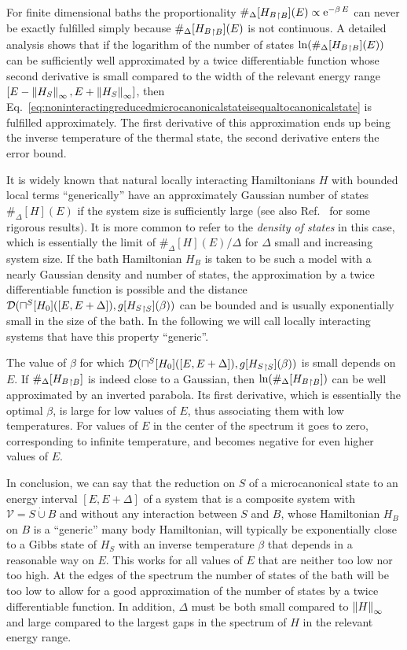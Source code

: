 \documentclass[a4paper,12pt,listof=totoc,index=totoc,bibliography=totoc,headsepline=false,headings=normal,BCOR16.153846mm,DIV12,headinclude,twoside,cleardoublepage=empty,numbers=noenddot,final]{scrreprt}
\theoremstyle{mystyle}
\numberwithin{equation}{section}
\numberwithin{figure}{section}
\numberwithin{lemma}{section}
\numberwithin{theorem}{section}
\numberwithin{corollary}{section}
\numberwithin{definition}{section}
\numberwithin{conjecture}{section}
\numberwithin{observation}{section}
\newcommand{\+}{\mkern2mu}
\newcommand{\dunion}{\mathbin{\dot{\cup}}}
\newcommand{\texteqref}[1]{Eq.~\eqref{#1}}
\renewcommand{\H}{H}
\newcommand{\rhog}{g}
\newcommand{\rhomc}{{\sqcap}}
\newcommand{\Vset}{\mathcal{V}}
\newcommand{\norm}[2][]{
  \ifthenelse{\equal{#1}{}}
    {\left\| {#2} \right\|}
    {\ifthenelse{\equal{#1}{uinv}}
      {\left\vert\kern-0.25ex\left\vert\kern-0.25ex\left\vert {#2} \right\vert\kern-0.25ex\right\vert\kern-0.25ex\right\vert}
      {\left\| {#2} \right\|_{#1}}
    }
}
\newcommand{\tracedistance}[3][]{
  \ifthenelse{\equal{#2}{}}
  {\ifthenelse{\equal{#3}{}}
    {\mathcal{D}_{#1}}{}
  }{
    \ifthenelse{\equal{#1}{}}
    {\operatorname{\mathcal{D}}(#2,#3)}
    {\operatorname{\mathcal{D}}_{#1}(#2,#3)}
  }
}
\newcommand{\trunc}[2]{{#1}_{\upharpoonright \mathnormal{#2}}}
\newcommand{\e}{\mathrm{e}}
\DeclareMathOperator{\1}{\mathds{1}}
\begin{document}
For finite dimensional baths the proportionality $\#_\Delta[\trunc{\H_B}B](E) \propto \e^{-\beta\,E}$ can never be exactly fulfilled simply because $\#_\Delta[\trunc{\H_B}B](E)$ is not continuous.
A detailed analysis \cite[Appendix A]{Riera2012} shows that if the logarithm of the number of states $\ln(\#_\Delta[\trunc{\H_B}B](E))$ can be sufficiently well approximated by a twice differentiable function whose second derivative is small compared to the width of the relevant energy range $[E-\norm[\infty]{\H_S},E+\norm[\infty]{\H_S}]$, then \texteqref{eq:noninteractingreducedmicrocanonicalstateisequaltocanonicalstate} is fulfilled approximately.
The first derivative of this approximation ends up being the inverse temperature of the thermal state, the second derivative enters the error bound.

It is widely known that natural locally interacting Hamiltonians $\H$ with bounded local terms ``generically'' have an approximately Gaussian number of states $\#_\Delta[\H](E)$ if the system size is sufficiently large \cite[Section 12.2]{Gemmer09} (see also Ref.~\cite{Hartmann2005} for some rigorous results).
It is more common to refer to the \emph{density of states} in this case, which is essentially the limit of $\#_\Delta[\H](E)/\Delta$ for $\Delta$ small and increasing system size.
If the bath Hamiltonian $\H_B$ is taken to be such a model with a nearly Gaussian density and number of states, the approximation by a twice differentiable function is possible and the distance $\tracedistance{\rhomc^S[\H_0]([E,E+\Delta])}{\rhog[\trunc{\H_S}S](\beta)}$ can be bounded \cite[Appendix B]{Riera2012} and is usually exponentially small in the size of the bath.
In the following we will call locally interacting systems that have this property ``generic''.

The value of $\beta$ for which $\tracedistance{\rhomc^S[\H_0]([E,E+\Delta])}{\rhog[\trunc{\H_S}S](\beta)}$ is small depends on $E$.
If $\#_\Delta[\trunc{\H_B}B]$ is indeed close to a Gaussian, then $\ln(\#_\Delta[\trunc{\H_B}B])$ can be well approximated by an inverted parabola.
Its first derivative, which is essentially the optimal $\beta$, is large for low values of $E$, thus associating them with low temperatures.
For values of $E$ in the center of the spectrum it goes to zero, corresponding to infinite temperature, and becomes negative for even higher values of $E$.

In conclusion, we can say that the reduction on $S$ of a microcanonical state to an energy interval $[E,E+\Delta]$ of a system that is a composite system with $\Vset = S \dunion B$ and without any interaction between $S$ and $B$, whose Hamiltonian $\H_B$ on $B$ is a ``generic'' many body Hamiltonian, will typically be exponentially close to a Gibbs state of $\H_S$ with an inverse temperature $\beta$ that depends in a reasonable way on $E$.
This works for all values of $E$ that are neither too low nor too high.
At the edges of the spectrum the number of states of the bath will be too low to allow for a good approximation of the number of states by a twice differentiable function.
In addition, $\Delta$ must be both small compared to $\norm[\infty]{\H}$ and large compared to the largest gaps in the spectrum of $\H$ in the relevant energy range.
\end{document}
